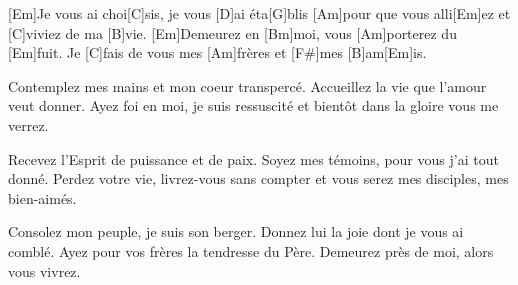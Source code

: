 

[Em]Je vous ai choi[C]sis,  je vous [D]ai éta[G]blis
[Am]pour que vous alli[Em]ez et [C]viviez de ma [B]vie.
[Em]Demeurez en [Bm]moi, vous [Am]porterez du [Em]fuit.
Je [C]fais de vous mes [Am]frères et [F#]mes [B]am[Em]is.

Contemplez mes mains et mon coeur transpercé.
Accueillez la vie que l’amour veut donner.
Ayez foi en moi, je suis ressuscité
et bientôt dans la gloire vous me verrez.

Recevez l’Esprit de puissance et de paix.
Soyez mes témoins, pour vous j’ai tout donné.
Perdez votre vie, livrez-vous sans compter
et vous serez mes disciples, mes bien-aimés.

Consolez  mon peuple, je suis son berger.
Donnez lui la joie dont je vous ai comblé.
Ayez pour vos frères la tendresse du Père.
Demeurez près de moi, alors vous vivrez.

